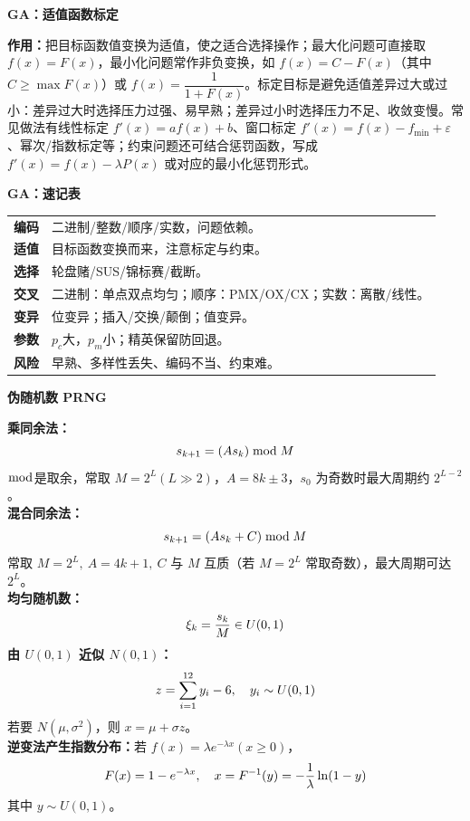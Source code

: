 \documentclass[8pt,a4paper]{ctexart}
\newcommand{\blk}[1]{%
  \par\needspace{2.2\baselineskip}%
  \vspace{1pt}\noindent
  \colorbox{black!10}{\parbox{\dimexpr\columnwidth-2\fboxsep\relax}{\textbf{#1}}}\par
  \vspace{1pt}}
\newcommand{\tightmath}[1]{\[
\vspace{-5pt}#1\vspace{-5pt}
\]}
\begin{document}
\begin{multicols*}{3}
\blk{GA：适值函数标定}
\textbf{作用：}把目标函数值变换为适值，使之适合选择操作；最大化问题可直接取 $f(x)=F(x)$，最小化问题常作非负变换，如 $f(x)=C-F(x)$（其中 $C\ge \max F(x)$）或 $f(x)=\dfrac{1}{1+F(x)}$。标定目标是避免适值差异过大或过小：差异过大时选择压力过强、易早熟；差异过小时选择压力不足、收敛变慢。常见做法有线性标定 $f'(x)=a f(x)+b$、窗口标定 $f'(x)=f(x)-f_{\min}+\varepsilon$、幂次/指数标定等；约束问题还可结合惩罚函数，写成 $f'(x)=f(x)-\lambda P(x)$ 或对应的最小化惩罚形式。

\blk{GA：速记表}
\begin{tabularx}{\columnwidth}{@{}>{\bfseries}p{1.55cm}X@{}}
编码 & 二进制/整数/顺序/实数，问题依赖。\\
适值 & 目标函数变换而来，注意标定与约束。\\
选择 & 轮盘赌/SUS/锦标赛/截断。\\
交叉 & 二进制：单点双点均匀；顺序：PMX/OX/CX；实数：离散/线性。\\
变异 & 位变异；插入/交换/颠倒；值变异。\\
参数 & $p_c$大，$p_m$小；精英保留防回退。\\
风险 & 早熟、多样性丢失、编码不当、约束难。\\
\end{tabularx}

\blk{伪随机数 PRNG}
\textbf{乘同余法：}
\tightmath{s_{k+1}=(A s_k)\bmod M}
$\bmod$是取余，常取 $M=2^L(L\gg2)$，$A=8k\pm3$，$s_0$ 为奇数时最大周期约 $2^{L-2}$。\\
\textbf{混合同余法：}
\tightmath{s_{k+1}=(A s_k+C)\bmod M}
常取 $M=2^L,\ A=4k+1,\ C$ 与 $M$ 互质（若 $M=2^L$ 常取奇数），最大周期可达 $2^L$。\\
\textbf{均匀随机数：}
\tightmath{\xi_k=\frac{s_k}{M}\in U(0,1)}
\textbf{由 $U(0,1)$ 近似 $N(0,1)$：}
\tightmath{z=\sum_{i=1}^{12} y_i-6,\quad y_i\sim U(0,1)}
若要 $N(\mu,\sigma^2)$，则 $x=\mu+\sigma z$。\\
\textbf{逆变法产生指数分布：}若 $f(x)=\lambda e^{-\lambda x}(x\ge0)$，
\tightmath{F(x)=1-e^{-\lambda x},\quad x=F^{-1}(y)=-\frac1\lambda\ln(1-y)}
其中 $y\sim U(0,1)$。


\end{multicols*}
\end{document}
